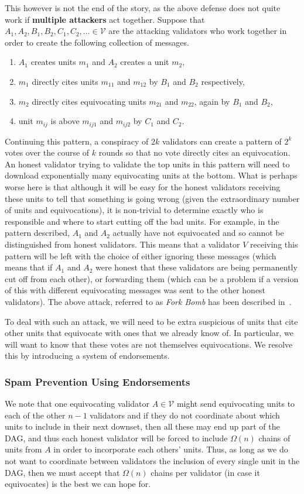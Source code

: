 \documentclass[12pt, fleqn]{article}
\newcommand{\cV}{\mathcal{V}}
\begin{document}
This however is not the end of the story, as the above defense does not quite work if {\bf multiple attackers} act together.
%
Suppose that $A_1,A_2,B_1,B_2,C_1,C_2,\ldots \in \cV$ are the attacking validators who work together in order to create the following collection of messages. 
\begin{enumerate}
    \item $A_1$ creates units $m_1$ and $A_2$ creates a unit $m_2$,
    \item $m_1$ directly cites units $m_{11}$ and $m_{12}$ by $B_1$ and $B_2$ respectively,
    \item $m_2$ directly cites equivocating units $m_{21}$ and $m_{22}$, again by $B_1$ and $B_2$,
    \item unit $m_{ij}$ is above $m_{ij1}$ and $m_{ij2}$ by $C_1$ and $C_2$.
\end{enumerate}
Continuing this pattern, a conspiracy of $2k$ validators can create a pattern of $2^k$ votes over the course of $k$ rounds so that no vote directly cites an equivocation.
%
An honest validator trying to validate the top units in this pattern will need to download exponentially many equivocating units at the bottom.
%
What is perhaps worse here is that although it will be easy for the honest validators receiving these units to tell that something is going wrong (given the extraordinary number of units and equivocations), it is non-trivial to determine exactly who is responsible and where to start cutting off the bad units.
%
For example, in the pattern described, $A_1$ and $A_2$ actually have not equivocated and so cannot be distinguished from honest validators.
%
This means that a validator $V$ receiving this pattern will be left with the choice of either ignoring these messages (which means that if $A_1$ and $A_2$ were honest that these validators are being permanently cut off from each other), or forwarding them (which can be a problem if a version of this with different equivocating messages was sent to the other honest validators).
%
The above attack, referred to as {\it Fork Bomb} has been described in~\cite{GLSS19}.

To deal with such an attack, we will need to be extra suspicious of units that cite other units that equivocate with ones that we already know of.
%
In particular, we will want to know that these votes are not themselves equivocations.
%
We resolve this by introducing a system of endorsements.


\subsubsection{Spam Prevention Using Endorsements}\label{sec:endorse}
We note that one equivocating validator $A\in \cV$ might send equivocating units to each of the other $n-1$ validators and if they do not coordinate about which units to include in their next downset, then all these may end up part of the DAG, and thus each honest validator will be forced to include $\Omega(n)$ chains of units from $A$ in order to incorporate each others' units.
%
Thus, as long as we do not want to coordinate between validators the inclusion of every single unit in the DAG, then we must accept that $\Omega(n)$ chains per validator (in case it equivocates) is the best we can hope for.
%
\end{document}
